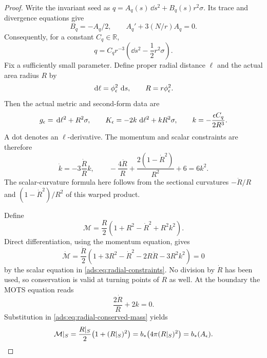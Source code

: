 \begin{proof}
Write the invariant seed as
$q=A_q(s)\,\dd s^2+B_q(s)r^2\sigma$.
Its trace and divergence equations give
\[
 B_q=-A_q/2,
 \qquad A_q'+3(N/r)A_q=0.
\]
Consequently, for a constant $C_q\in\mathbb R$,
\begin{equation}
 q=C_qr^{-3}\left(\dd s^2-\frac12r^2\sigma\right).
 \label{ads:eq:radial-tt-tensor}
\end{equation}
Fix a sufficiently small parameter.  Define proper radial distance
$\ell$ and the actual area radius $R$ by
\[
 \,\mathrm d\ell=\phi_\epsilon^2\,\,\mathrm d s,
 \qquad R=r\phi_\epsilon^2.
\]
Then the actual metric and second-form data are
\[
 g_\epsilon=\,\mathrm d\ell^2+R^2\sigma,
 \qquad K_\epsilon=-2k\,\,\mathrm d\ell^2+kR^2\sigma,
 \qquad k=-\frac{\epsilon C_q}{2R^3}.
\]
A dot denotes an $\ell$-derivative.  The momentum and scalar constraints
are therefore
\begin{equation}
 \dot k=-3\frac{\dot R}{R}k,
 \qquad
 -\frac{4\ddot R}{R}
 +\frac{2(1-\dot R^2)}{R^2}+6=6k^2.
 \label{ads:eq:radial-constraints}
\end{equation}
The scalar-curvature formula here follows from the sectional curvatures
$-\ddot R/R$ and $(1-\dot R^2)/R^2$ of this warped product.

Define
\begin{equation}
 \mathcal M
 =\frac R2\left(1+R^2-\dot R^2+R^2k^2\right).
 \label{ads:eq:radial-conserved-mass}
\end{equation}
Direct differentiation, using the momentum equation, gives
\[
 \dot{\mathcal M}
 =\frac{\dot R}{2}
 \left(1+3R^2-\dot R^2-2R\ddot R-3R^2k^2\right)=0
\]
by the scalar equation in \eqref{ads:eq:radial-constraints}.
No division by $\dot R$ has been used, so conservation is valid at
turning points of $R$ as well.
At the boundary the MOTS equation reads
\[
 \frac{2\dot R}{R}+2k=0.
\]
Substitution in \eqref{ads:eq:radial-conserved-mass} yields
\begin{equation}
 \mathcal M|_S
 =\frac{R|_S}{2}\bigl(1+(R|_S)^2\bigr)
 =b_*\bigl(4\pi(R|_S)^2\bigr)=b_*(A_\epsilon).
 \label{ads:eq:radial-mass-at-boundary}
\end{equation}


\end{proof}
